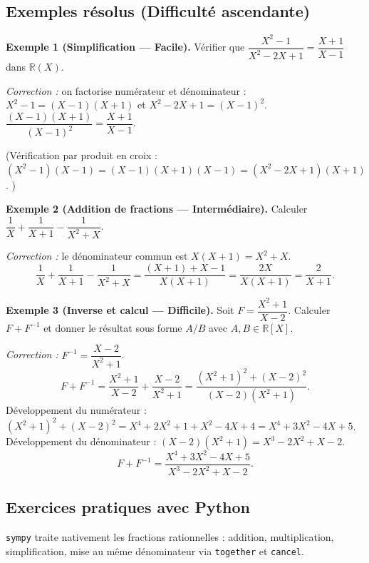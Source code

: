 \subsection{Exemples résolus (Difficulté ascendante)}

\textbf{Exemple 1 (Simplification --- Facile).}
Vérifier que $\dfrac{X^2 - 1}{X^2 - 2X + 1} = \dfrac{X + 1}{X - 1}$ dans $\mathbb{R}(X)$.

\textit{Correction :} on factorise numérateur et dénominateur :
$X^2 - 1 = (X - 1)(X + 1)$ et $X^2 - 2X + 1 = (X - 1)^2$.
$\dfrac{(X-1)(X+1)}{(X-1)^2} = \dfrac{X + 1}{X - 1}$. \checkmark

(Vérification par produit en croix : $(X^2 - 1)(X - 1) = (X - 1)(X + 1)(X - 1) = (X^2 - 2X + 1)(X + 1)$. \checkmark)

\medskip

\textbf{Exemple 2 (Addition de fractions --- Intermédiaire).}
Calculer $\dfrac{1}{X} + \dfrac{1}{X + 1} - \dfrac{1}{X^2 + X}$.

\textit{Correction :} le dénominateur commun est $X(X + 1) = X^2 + X$.
\[ \frac{1}{X} + \frac{1}{X+1} - \frac{1}{X^2 + X} = \frac{(X + 1) + X - 1}{X(X + 1)} = \frac{2X}{X(X+1)} = \frac{2}{X + 1}. \]

\medskip

\textbf{Exemple 3 (Inverse et calcul --- Difficile).}
Soit $F = \dfrac{X^2 + 1}{X - 2}$. Calculer $F + F^{-1}$ et donner le résultat sous forme $A/B$ avec $A, B \in \mathbb{R}[X]$.

\textit{Correction :} $F^{-1} = \dfrac{X - 2}{X^2 + 1}$.
\[ F + F^{-1} = \frac{X^2 + 1}{X - 2} + \frac{X - 2}{X^2 + 1} = \frac{(X^2 + 1)^2 + (X - 2)^2}{(X - 2)(X^2 + 1)}. \]
Développement du numérateur : $(X^2 + 1)^2 + (X - 2)^2 = X^4 + 2X^2 + 1 + X^2 - 4X + 4 = X^4 + 3X^2 - 4X + 5$.
Développement du dénominateur : $(X - 2)(X^2 + 1) = X^3 - 2X^2 + X - 2$.
\[ F + F^{-1} = \frac{X^4 + 3X^2 - 4X + 5}{X^3 - 2X^2 + X - 2}. \]

\subsection{Exercices pratiques avec Python}
\texttt{sympy} traite nativement les fractions rationnelles : addition, multiplication, simplification, mise au même dénominateur via \texttt{together} et \texttt{cancel}.

